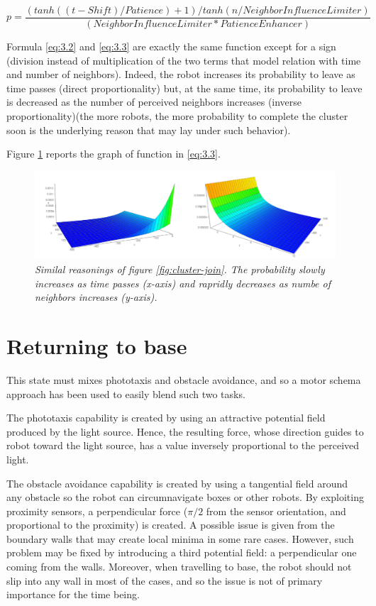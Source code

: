 \begin{equation}
    p =  \frac{(tanh((t - Shift) / Patience) + 1) / tanh(n / NeighborInfluenceLimiter)}{(NeighborInfluenceLimiter * PatienceEnhancer)} \tag{3.3}\label{eq:3.3}
\end{equation}

Formula \ref{eq:3.2} and \ref{eq:3.3} are exactly the same function except for a sign (division instead of multiplication of the two terms that model relation with time and number of neighbors). Indeed, the robot increases its probability to leave as time passes (direct proportionality) but, at the same time, its probability to leave is decreased as the number of perceived neighbors increases (inverse proportionality)(the more robots, the more probability to complete the cluster soon is the underlying reason that may lay under such behavior). 

\noindent
Figure \ref{fig:cluster-leave} reports the graph of function in \ref{eq:3.3}.

\begin{figure}[H]
\centering
\includegraphics[width=\linewidth]{images/cluster_leave.png}
\caption{\textit{Similal reasonings of figure \ref{fig:cluster-join}. The probability slowly increases as time passes (x-axis) and rapridly decreases as numbe of neighbors increases (y-axis).}}
\label{fig:cluster-leave}
\end{figure}

\section{Returning to base}

This state must mixes phototaxis and obstacle avoidance, and so a motor schema approach has been used to easily blend such two tasks.

\smallskip
The phototaxis capability is created by using an attractive potential field produced by the light source. Hence, the resulting force, whose direction guides to robot toward the light source, has a value inversely proportional to the perceived light.

\smallskip
The obstacle avoidance capability is created by using a tangential field around any obstacle so the robot can circumnavigate boxes or other robots. By exploiting proximity sensors, a perpendicular force ($\pi/2$ from the sensor orientation, and proportional to the proximity) is created. A possible issue is given from the boundary walls that may create local minima in some rare cases. However, such problem may be fixed by introducing a third potential field: a perpendicular one coming from the walls. Moreover, when travelling to base, the robot should not slip into any wall in most of the cases, and so the issue is not of primary importance for the time being.
 


